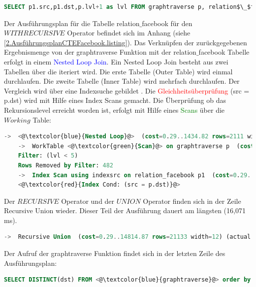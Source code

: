\begin{lstlisting}[language=SQL,caption = Überprüfen der Abbruchbedingung,frame=single, label={2.Abbruchbedingung.listing} ]
    SELECT p1.src,p1.dst,p.lvl+1 as lvl FROM graphtraverse p, relation$\_$facebook p1 WHERE p1.src IN ( p.dst ) and <@\textcolor{red}{lvl<5} @>
\end{lstlisting}
Der Ausführungsplan für die Tabelle relation$\_$facebook für den $WITH RECURSIVE$ Operator befindet sich im Anhang (siehe \ref{2.AusführungsplanCTEFacebook.listing}).
Das Verknüpfen der zurückgegebenen Ergebnismenge von der graphtraverse Funktion mit der relation$\_$facebook Tabelle erfolgt in einem \textcolor{blue}{Nested Loop Join}.
Ein Nested Loop Join besteht aus zwei Tabellen über die iteriert wird.
Die erste Tabelle (Outer Table) wird einmal durchlaufen.
Die zweite Tabelle (Inner Table) wird mehrfach durchlaufen.
Der Vergleich wird über eine Indexsuche gebildet \cite[Seite 213]{froehlich01}.
Die \textcolor{red}{Gleichheitsüberprüfung} (src = p.dst) wird mit Hilfe eines Index Scans gemacht.
Die Überprüfung ob das Rekursionslevel erreicht worden ist, erfolgt mit Hilfe eines \textcolor{green}{Scans} über die $Working$ Table:
\begin{lstlisting}[language=SQL,caption = Überprüfung der WHERE Bedingung,frame=single, label={2.WhereConditionCTE.listing} ]
    ->  <@\textcolor{blue}{Nested Loop}@>  (cost=0.29..1434.82 rows=2111 width=12) (actual time=0.018..2.174 rows=8173 loops=5)
    ->  WorkTable <@\textcolor{green}{Scan}@> on graphtraverse p  (cost=0.00..5.17 rows=77 width=8) (actual time=0.016..0.065 rows=729 loops=5)
    Filter: (lvl < 5)
    Rows Removed by Filter: 482
    ->  Index Scan using indexsrc on relation_facebook p1  (cost=0.29..18.23 rows=27 width=8) (actual time=0.001..0.002 rows=11 loops=3645)
    <@\textcolor{red}{Index Cond: (src = p.dst)}@>
\end{lstlisting}
Der $RECURSIVE$ Operator und der $UNION$ Operator finden sich in der Zeile Recursive Union wieder.
Dieser Teil der Ausführung dauert am längsten (16,071 ms).
\begin{lstlisting}[language=SQL,caption = Aufruf RECURSIVE und UNION Operator,frame=single, label={2.WhereConditionCTE.listing} ]
    ->  Recursive Union  (cost=0.29..14814.87 rows=21133 width=12) (actual time=0.014..16.085 rows=6056 loops=1)
\end{lstlisting}
\newpage
Der Aufruf der graphtraverse Funktion findet sich in der letzten Zeile des Ausführungsplan:
\begin{lstlisting}[language=SQL,caption = Aufruf der graphtraverse Funktion,frame=single, label={2.WhereConditionCTE.listing} ]
    SELECT DISTINCT(dst) FROM <@\textcolor{blue}{graphtraverse}@> order by dst
\end{lstlisting}

